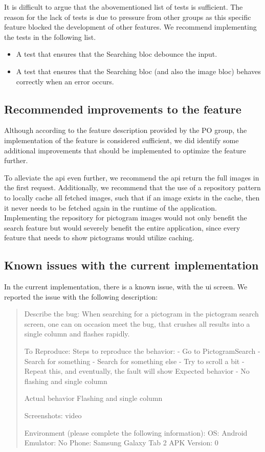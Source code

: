 It is difficult to argue that the abovementioned list of tests is sufficient. The reason for the lack of tests is due to pressure from other groups as this specific feature blocked the development of other features. We recommend implementing the tests in the following list. 

\begin{itemize}
  \item A test that ensures that the Searching \gls{bloc} debounce the input.
  \item A test that ensures that the Searching \gls{bloc} (and also the image \gls{bloc}) behaves correctly when an error occurs.
\end{itemize}

\subsection{Recommended improvements to the feature}
Although according to the feature description provided by the \gls{PO} group, the implementation of the feature is considered sufficient, we did identify some additional improvements that should be implemented to optimize the feature further. 

To alleviate the \gls{api} even further, we recommend the \gls{api} return the full images in the first request. Additionally, we recommend that the use of a repository pattern to locally cache all fetched images, such that if an image exists in the cache, then it never needs to be fetched again in the runtime of the application. Implementing the repository for pictogram images would not only benefit the search feature but would severely benefit the entire application, since every feature that needs to show pictograms would utilize caching.

\subsection{Known issues with the current implementation}
In the current implementation, there is a known issue, with the \gls{ui} screen. We reported the issue with the following description:

\begin{quote}
Describe the bug:
When searching for a pictogram in the pictogram search screen, one can on occasion meet the bug, that crushes all results into a single column and flashes rapidly.

To Reproduce:
Steps to reproduce the behavior:
- Go to PictogramSearch
- Search for something
- Search for something else
- Try to scroll a bit
- Repeat this, and eventually, the fault will show Expected behavior
- No flashing and single column

Actual behavior
Flashing and single column

Screenshots:
video

Environment (please complete the following information):
OS: Android
Emulator: No
Phone: Samsung Galaxy Tab 2
APK Version: 0
\end{quote}
